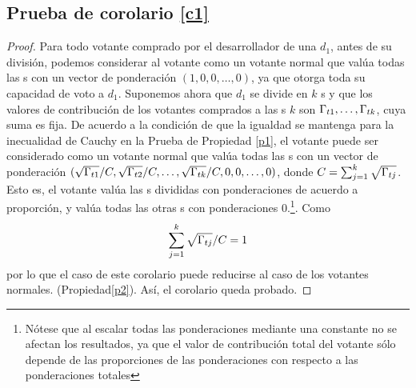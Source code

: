 \subsection{Prueba de corolario \ref{c1}}
\label{subsection:proof3}
\begin{proof}
	Para todo votante comprado por el desarrollador de una \dapp $d_1$, antes de su división, podemos considerar al votante como un votante normal que valúa todas las {\dapp}s con un vector de ponderación $(1,0,0,\ldots,0)$, ya que otorga toda su capacidad de voto a $d_1$.
	Suponemos ahora que $d_1$ se divide en $k$ {\dapp}s y que los valores de contribución de los votantes comprados a las {\dapp}s $k$ son $\Gamma_{t1},\ldots,\Gamma_{tk}$, cuya suma es fija. De acuerdo a la condición de que la igualdad se mantenga para la inecualidad de Cauchy en la Prueba de Propiedad \ref{p1}, el votante puede ser considerado como un votante normal que valúa todas las {\dapp}s con un vector de ponderación
	$(\sqrt{\Gamma_{t1}}/C,\sqrt{\Gamma_{t2}}/C,\ldots, \sqrt{\Gamma_{tk}}/C,0,0,\ldots,0)$, donde $C=\sum_{j=1}^k \sqrt{\Gamma_{tj}}$. Esto es, el votante valúa las {\dapp}s divididas con ponderaciones de acuerdo a proporción, y valúa todas las otras {\dapp}s con ponderaciones 0.\footnote{Nótese que al escalar todas las ponderaciones mediante una constante no se afectan los resultados, ya que el valor de contribución total del votante sólo depende de las proporciones de las ponderaciones con respecto a las ponderaciones totales}. Como
		$$\sum_{j=1}^k \sqrt{\Gamma_{tj}}/C =1$$
	por lo que el caso de este corolario puede reducirse al caso de los votantes normales. (Propiedad\ref{p2}). Así, el corolario queda probado.
\end{proof}

